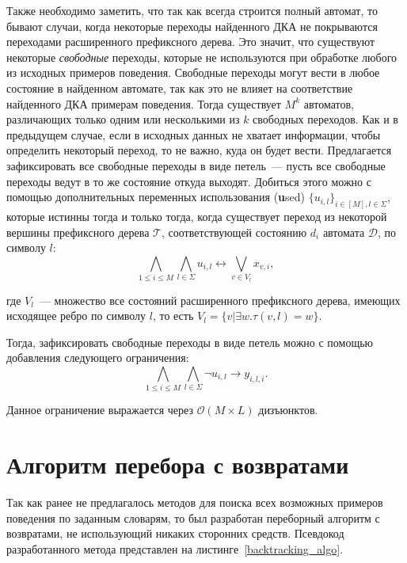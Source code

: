 Также необходимо заметить, что так как всегда строится полный автомат, то бывают случаи, когда некоторые переходы найденного ДКА не покрываются переходами расширенного префиксного дерева.
Это значит, что существуют некоторые \emph{свободные} переходы, которые не используются при обработке любого из исходных примеров поведения.
Свободные переходы могут вести в любое состояние в найденном автомате, так как это не влияет на соответствие найденного ДКА примерам поведения.
Тогда существует $M^{k}$ автоматов, различающих только одним или несколькими из $k$ свободных переходов.
Как и в предыдущем случае, если в исходных данных не хватает информации, чтобы определить некоторый переход, то не важно, куда он будет вести.
Предлагается зафиксировать все свободные переходы в виде петель~{---} пусть все свободные переходы ведут в то же состояние откуда выходят.
Добиться этого можно с помощью дополнительных переменных использования (\textbf{u}sed) $\{u_{i,l}\}_{i \in \left[M\right],l \in \Sigma}$, которые истинны тогда и только тогда, когда существует переход из некоторой вершины префиксного дерева $\mathcal{T}$, соответствующей состоянию $d_{i}$ автомата $\mathcal{D}$, по символу $l$:
\begin{equation*}
\bigwedge_{1 \leq i \leq M} \bigwedge_{l \in \Sigma} u_{i,l} \leftrightarrow \bigvee_{v \in V_{l}}x_{v,i},
\end{equation*}

где $V_{l}$~{---} множество все состояний расширенного префиксного дерева, имеющих исходящее ребро по символу $l$, то есть $V_{l} = \{v | \exists w.\tau\left(v,l\right) = w\}$.

Тогда, зафиксировать свободные переходы в виде петель можно с помощью добавления следующего ограничения:
\begin{equation*}
\bigwedge_{1 \leq i \leq M} \bigwedge_{l \in \Sigma} \neg u_{i,l} \rightarrow y_{i,l,i}.
\end{equation*}

Данное ограничение выражается через $\mathcal{O}\left(M\times L\right)$ дизъюнктов.

\section{Алгоритм перебора с возвратами}
\label{sec:findall:backtracking}

Так как ранее не предлагалось методов для поиска всех возможных примеров поведения по заданным словарям, то был разработан переборный алгоритм с возвратами, не использующий никаких сторонних средств.
Псевдокод разработанного метода представлен на листинге~\ref{backtracking_algo}.


